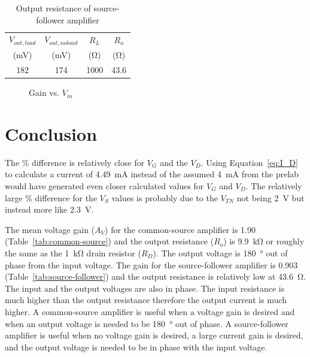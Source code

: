 \begin{table}[hbtp]
  \centering
  \begin{tabular}{cccc}
    $V_{out,load}$ & $V_{out,no load}$ & $R_L$       & $R_o$       \\
    (\si{mV})      & (\si{mV})         & (\si{\ohm}) & (\si{\ohm}) \\
    \hline
    182            & 174               & 1000        & 43.6        \\
    \end{tabular}
    \caption{\label{tab:ro_follow} Output resistance of source-follower amplifier}
\end{table}

\begin{figure}[hbtp]
  \centering
  \resizebox{1.0\textwidth}{!}{}
  \caption{\label{fig:graph} Gain vs. $V_{in}$}
\end{figure}

\newpage

\section{Conclusion}
\label{sec:conclusion}

The \% difference is relatively close for $V_G$ and the $V_D$.  Using Equation~\ref{eq:I_D} to calculate a current of \SI{4.49}{mA} instead of the assumed \SI{4}{mA} from the prelab would have generated even closer calculated values for $V_G$ and $V_D$.  The relatively large \% difference for the $V_S$ values is probably due to the $V_{TN}$ not being \SI{2}{V} but instead more like \SI{2.3}{V}.

The mean voltage gain ($A_V$) for the common-source amplifier is 1.90 (Table~\ref{tab:common-source}) and the output resistance ($R_o$) is \SI{9.9}{\kilo\ohm} or roughly the same as the \SI{1}{\kilo\ohm} drain resistor ($R_D$).  The output voltage is \SI{180}{\degree} out of phase from the input voltage.  The gain for the source-follower amplifier is 0.903 (Table~\ref{tab:source-follower}) and the output resistance is relatively low at \SI{43.6}{\ohm}.  The input and the output voltages are also in phase.   The input resistance is much higher than the output resistance therefore the output current is much higher.   A common-source amplifier is useful when a voltage gain is desired and when an output voltage is needed to be \SI{180}{\degree} out of phase.  A source-follower amplifier is useful when no voltage gain is desired, a large current gain is desired, and the output voltage is needed to be in phase with the input voltage.

